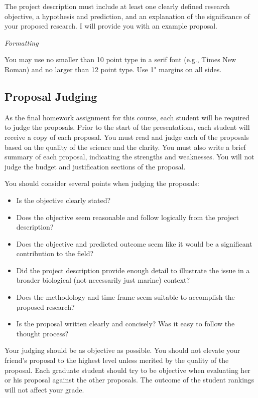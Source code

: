 \documentclass[11pt]{article}
\newcommand{\VSpace}{\vspace{\baselineskip}}
\begin{document}
The project description must include at least one clearly defined research objective, a hypothesis and prediction, and an explanation of the significance of your proposed research.  I will provide you with an example proposal. \VSpace

\noindent\emph{Formatting}\vspace{0.5\baselineskip}

You may use no smaller than 10 point type in a serif font (e.g., Times New Roman) and no larger than 12 point type.  Use 1" margins on all sides.

\subsection*{Proposal Judging}

As the final homework assignment for this course, each student will be required to judge the proposals.  Prior to the start of the presentations, each student will receive a copy of each proposal.  You must read and judge each of the proposals based on the quality of the science and the clarity.  You must also write a brief summary of each proposal, indicating the strengths and weaknesses.  You will not judge the budget and justification sections of the proposal.  

You should consider several points when judging the proposals:
\begin{itemize}
	\item Is the objective clearly stated?  
	\item Does the objective seem reasonable and follow logically from the project description?  
	\item Does the objective and predicted outcome seem like it would be a significant contribution to the field?
	\item Did the project description provide enough detail to illustrate the issue in a broader biological (not necessarily just marine) context?
	\item Does the methodology and time frame seem suitable to accomplish the proposed research?
	\item Is the proposal written clearly and concisely? Was it easy to follow the thought process?
\end{itemize}

Your judging should be as objective as possible.  You should not elevate your friend’s proposal to the highest level unless merited by the quality of the proposal.  Each graduate student should try to be objective when evaluating her or his proposal against the other proposals.  The outcome of the student rankings will not affect your grade.
\end{document}
